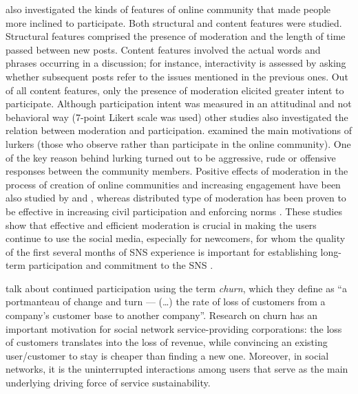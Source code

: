 \documentclass[a4paper,fleqn]{cas-dc}
\begin{document}
\citet{wise2006moderation} also investigated the kinds of features of online community that made people more inclined to participate. Both structural and content features were studied.  Structural features comprised the presence of moderation and the length of time passed between new posts. Content features involved the actual words and phrases occurring in a discussion; for instance, interactivity is assessed by asking whether subsequent posts refer to the issues mentioned in the previous ones.  
Out of all content features, only the presence of moderation elicited greater intent to participate.
Although participation intent was measured in an attitudinal and not behavioral way (7-point Likert scale was used) other studies also investigated the relation between moderation and participation. \citet{preece2004top} examined the main motivations of lurkers (those who observe rather than participate in the online community). One of the key reason behind lurking turned out to be aggressive, rude or offensive responses between the community members. Positive effects of moderation in the process of creation of online communities and increasing engagement have 
been also studied by \citet{meyer2014moderation} and \citet{carey2016influences}, whereas distributed type of moderation has been proven to be effective in increasing civil participation and enforcing norms \citep{lampe2014crowdsourcing}. These studies show that effective and efficient moderation is crucial in making the users continue to use the social media, especially for newcomers, for whom the quality of the first several months of SNS experience is important for  establishing long-term participation and commitment to the SNS \citep{raub2015phenomenological}.



\citet{sadeque2019predicting} talk about continued participation using the term \textit{churn}, which they define as ``a portmanteau of change and turn --- (\dots) 
the rate of loss of customers from a company's customer base to another company''. Research on churn has an important motivation for social network service-providing corporations: the loss of customers translates into the loss of revenue, while convincing an existing user/customer to stay is cheaper than finding a new one. Moreover, in social networks, 
it is the uninterrupted 
interactions among users that serve as the main underlying driving force of service sustainability.
\end{document}
